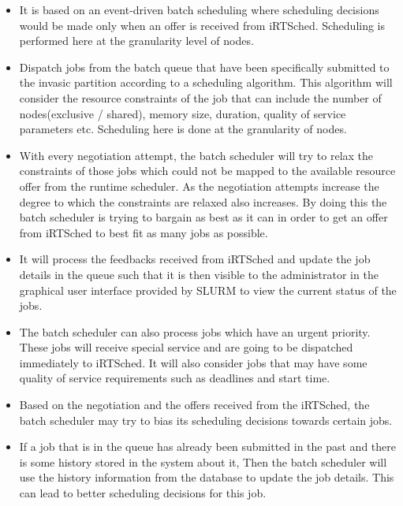 \begin{itemize}
\item It is based on an event-driven batch scheduling where scheduling decisions would be made only when an offer is received from iRTSched. Scheduling is performed here at the granularity level of nodes.
\item Dispatch jobs from the batch queue that have been specifically submitted to the invasic partition according to a scheduling algorithm. This algorithm will consider the resource constraints of the job that can include the number of nodes(exclusive / shared), memory size, duration, quality of service parameters etc. Scheduling here is done at the granularity of nodes.
\item With every negotiation attempt, the batch scheduler will try to relax the constraints of those jobs which could not be mapped to the available resource offer from the runtime scheduler. As the negotiation attempts increase the degree to which the constraints are relaxed also increases. By doing this the batch scheduler is trying to bargain as best as it can in order to get an offer from iRTSched to best fit as many jobs as possible.
\item It will process the feedbacks received from iRTSched and update the job details in the queue such that it is then visible to the administrator in the graphical user interface provided by SLURM to view the current status of the jobs.
\item The batch scheduler can also process jobs which have an urgent priority. These jobs will receive special service and are going to be dispatched immediately to iRTSched. It will also consider jobs that may have some quality of service requirements such as deadlines and start time.
\item Based on the negotiation and the offers received from the iRTSched, the batch scheduler may try to bias its scheduling decisions towards certain jobs.
\item If a job that is in the queue has already been submitted in the past and there is some history stored in the system about it, Then the batch scheduler will use the history information from the database to update the job details. This can lead to better scheduling decisions for this job.
\end{itemize}
